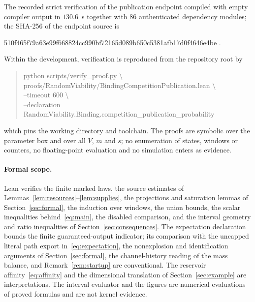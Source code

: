 \documentclass[11pt,a4paper]{article}
\theoremstyle{plain}
\theoremstyle{definition}
\theoremstyle{remark}
\begin{document}
The recorded strict verification of the publication endpoint compiled with empty compiler output in $130.6$~s together with $86$ authenticated dependency modules; the SHA-256 of the endpoint source is
\begin{center}\footnotesize\ttfamily
510f465f79a63e99f668824cc990bf72165d089b650c5381afb17d0f4646e4be .
\end{center}
Within the development, verification is reproduced from the repository root by
\begin{quote}\footnotesize\ttfamily
python scripts/verify\_proof.py \textbackslash\\
\hspace*{2em}proofs/RandomViability/BindingCompetitionPublication.lean \textbackslash\\
\hspace*{2em}--timeout 600 \textbackslash\\
\hspace*{2em}--declaration RandomViability.Binding.competition\_publication\_probability
\end{quote}
which pins the working directory and toolchain. The proofs are symbolic over the parameter box and over all $V$, $m$ and $s$; no enumeration of states, windows or counters, no floating-point evaluation and no simulation enters as evidence.

\paragraph{Formal scope.}
Lean verifies the finite marked laws, the source estimates of Lemmas~\ref{lem:resources}--\ref{lem:supplies}, the projections and saturation lemmas of Section~\ref{sec:formal}, the induction over windows, the union bounds, the scalar inequalities behind~\eqref{eq:main}, the disabled comparison, and the interval geometry and ratio inequalities of Section~\ref{sec:consequences}. The expectation declaration bounds the finite guaranteed-output indicator; its comparison with the uncapped literal path export in~\eqref{eq:expectation}, the nonexplosion and identification arguments of Section~\ref{sec:formal}, the channel-history reading of the mass balance, and Remark~\ref{rem:startup} are conventional. The reservoir affinity~\eqref{eq:affinity} and the dimensional translation of Section~\ref{sec:example} are interpretations. The interval evaluator and the figures are numerical evaluations of proved formulas and are not kernel evidence.



\end{document}
